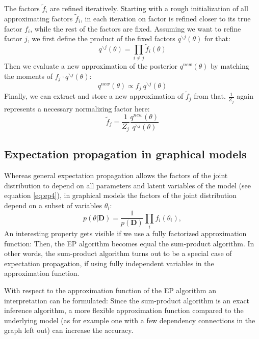 \documentclass{sigkdd}
\begin{document}
The factors $\tilde{f}_i$ are refined iteratively. Starting with a rough initialization of all approximating factors $\tilde{f}_i$, in each iteration on factor is refined closer to its true factor $f_i$, while the rest of the factors are fixed. Assuming we want to refine factor $j$, we first define the product of the fixed factors $q^{\backslash j}(\theta)$ for that:
\begin{equation}\label{eq:ep7}
q^{\backslash j}(\theta) = \prod_{i\ne j} \tilde{f}_i(\theta)
\end{equation}
Then we evaluate a new approximation of the posterior $q^{new}(\theta)$ by matching the moments of $f_j \cdot q^{\backslash j}(\theta)$:
\begin{equation}\label{eq:ep7.1}
q^{new}(\theta) \propto f_j ~ q^{\backslash j}(\theta)
\end{equation}
Finally, we can extract and store a new approximation of $\tilde{f}_j$ from that. $\frac{1}{Z_j}$ again represents a necessary normalizing factor here:
\begin{equation}\label{eq:ep8}
\tilde{f}_j = \frac{1}{Z_j} \frac{q^{new}(\theta)}{q^{\backslash j}(\theta)}
\end{equation}

\subsection{Expectation propagation in graphical models}
Whereas general expectation propagation allows the factors of the joint distribution to depend on all parameters and latent variables of the model (see equation \ref{eq:ep4}), in graphical models the factors of the joint distribution depend on a subset of variables $\theta_i$:
\begin{equation}\label{eq:ep9}
p(\theta|\mathbf{D}) = \frac{1}{p(\mathbf{D})} \prod_i f_i(\theta_i),
\end{equation}
An interesting property gets visible if we use a fully factorized approximation function: Then, the EP algorithm becomes equal the sum-product algorithm. In other words, the sum-product algorithm turns out to be a special case of expectation propagation, if using fully independent variables in the approximation function.

With respect to the approximation function of the EP algorithm an interpretation can be formulated: Since the sum-product algorithm is an exact inference algorithm, a more flexible approximation function compared to the underlying model (as for example one with a few dependency connections in the graph left out) can increase the accuracy.
\end{document}
